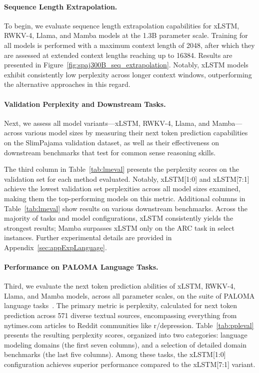 \paragraph{Sequence Length Extrapolation.}
\label{sec:spaj300B_ctx_extrapolation}
To begin, we evaluate sequence length extrapolation capabilities for xLSTM, RWKV-4, Llama, and Mamba models at the 1.3B parameter scale. Training for all models is performed with a maximum context length of 2048, after which they are assessed at extended context lengths reaching up to 16384. Results are presented in Figure~\ref{fig:spaj300B_seq_extrapolation}. Notably, xLSTM models exhibit consistently low perplexity across longer context windows, outperforming the alternative approaches in this regard.

\paragraph{Validation Perplexity and Downstream Tasks.}
\label{sec:spaj_downstream_eval}
Next, we assess all model variants—xLSTM, RWKV-4, Llama, and Mamba—across various model sizes by measuring their next token prediction capabilities on the SlimPajama validation dataset, as well as their effectiveness on downstream benchmarks that test for common sense reasoning skills.

The third column in Table~\ref{tab:lmeval} presents the perplexity scores on the validation set for each method evaluated. Notably, xLSTM[1:0] and xLSTM[7:1] achieve the lowest validation set perplexities across all model sizes examined, making them the top-performing models on this metric. Additional columns in Table~\ref{tab:lmeval} show results on various downstream benchmarks. Across the majority of tasks and model configurations, xLSTM consistently yields the strongest results; Mamba surpasses xLSTM only on the ARC task in select instances. Further experimental details are provided in Appendix~\ref{sec:appExpLanguage}.

\paragraph{Performance on PALOMA Language Tasks.} Third, we evaluate the next token prediction abilities of xLSTM, RWKV-4, Llama, and Mamba models, across all parameter scales, on the suite of PALOMA language tasks~\citep{Magnusson:23arxivshort}. The primary metric is perplexity, calculated for next token prediction across 571 diverse textual sources, encompassing everything from nytimes.com articles to Reddit communities like r/depression.  
Table~\ref{tab:ppleval} presents the resulting perplexity scores, organized into two categories: language modeling domains (the first seven columns), and a selection of detailed domain benchmarks (the last five columns). Among these tasks, the xLSTM[1:0] configuration achieves superior performance compared to the xLSTM[7:1] variant.

